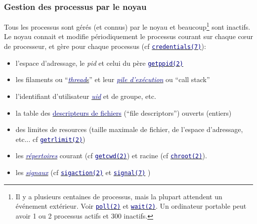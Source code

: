 \documentclass[lualatex,11pt,a4paper,svgnames,french]{beamer}
\begin{document}
\begin{frame}\frametitle{Gestion des processus par le noyau}
  \begin{relsize}{-0.5}
  Tous les processus sont gérés (et connus) par le noyau et
  beaucoup\footnote{Il y a plusieurs centaines de processus, mais la
  plupart attendent un événement extérieur. Voir
  \href{https://man7.org/linux/man-pages/man2/poll.2.html}{\texttt{\textcolor{Navy}{poll(2)}}}
  et
  \href{https://man7.org/linux/man-pages/man2/wait.2.html}{\texttt{\textcolor{Navy}{wait(2)}}}. Un
  ordinateur portable peut avoir 1 ou 2 processus actifs et 300
  inactifs.}  sont inactifs. Le noyau connait et modifie
  périodiquement le processus courant sur chaque c{\oe}ur de
  processeur, et gère pour chaque processus (cf 
  \href{https://man7.org/linux/man-pages/man7/credentials.7.html}{\texttt{\textcolor{Navy}{credentials(7)}}}):
  \end{relsize}

  \begin{relsize}{-1}
  \begin{itemize}
  \item l'espace d'adressage, le \textit{pid} et celui du père
    \href{https://man7.org/linux/man-pages/man2/getppid.2.html}{\texttt{\textcolor{Navy}{getppid(2)}}}
    \item les filaments ou 
      ``{\href{https://fr.wikipedia.org/wiki/Thread_(informatique)}{\textit{\textcolor{Navy}{thread}}s}}''
    et leur
      {\href{https://fr.wikipedia.org/wiki/Pile_d'exécution}{\textit{\textcolor{Navy}{pile
              d'exécution}}}} ou ``call stack''
  \item l'identifiant d'utilisateur
      {\href{https://fr.wikipedia.org/wiki/User_identifier}{\textit{\textcolor{Navy}{uid}}}} et de groupe, etc.
  \item la table des
    \href{https://fr.wikipedia.org/wiki/Descripteur_de_fichier}{\textcolor{Navy}{descripteurs
        de fichiers}} (``file descriptors'') ouverts (entiers)
  \item des limites de resources (taille maximale de fichier, de l'espace d'adressage, etc... cf
    \href{https://man7.org/linux/man-pages/man2/getrlimit.2.html}{\texttt{\textcolor{Navy}{getrlimit(2)}}})
    \item les 
    \href{https://fr.wikipedia.org/wiki/Répertoire_(informatique)}{\textcolor{Navy}{\textit{répertoires}}} courant (cf
    \href{https://man7.org/linux/man-pages/man2/getcwd.2.html}{\texttt{\textcolor{Navy}{getcwd(2)}}}) et racine (cf
    \href{https://man7.org/linux/man-pages/man2/chroot.2.html}{\texttt{\textcolor{Navy}{chroot(2)}}}).
    \item les \href{https://fr.wikipedia.org/wiki/Signal_(informatique)}{\textcolor{Navy}{\textit{signaux}}} (cf
      \href{https://man7.org/linux/man-pages/man2/sigaction.2.html}{\texttt{\textcolor{Navy}{sigaction(2)}}}
      et
      \href{https://man7.org/linux/man-pages/man7/signal.7.html}{\texttt{\textcolor{Navy}{signal(7)}}}
      )
  \end{itemize}
  \end{relsize}
\end{frame}
\end{document}
